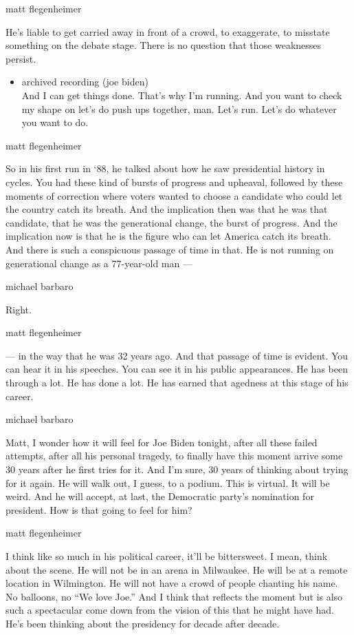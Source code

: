 matt flegenheimer

He's liable to get carried away in front of a crowd, to exaggerate, to
misstate something on the debate stage. There is no question that those
weaknesses persist.

\begin{itemize}
\tightlist
\item
  archived recording (joe biden)\\
  And I can get things done. That's why I'm running. And you want to
  check my shape on let's do push ups together, man. Let's run. Let's do
  whatever you want to do.
\end{itemize}

matt flegenheimer

So in his first run in `88, he talked about how he saw presidential
history in cycles. You had these kind of bursts of progress and
upheaval, followed by these moments of correction where voters wanted to
choose a candidate who could let the country catch its breath. And the
implication then was that he was that candidate, that he was the
generational change, the burst of progress. And the implication now is
that he is the figure who can let America catch its breath. And there is
such a conspicuous passage of time in that. He is not running on
generational change as a 77-year-old man ---

michael barbaro

Right.

matt flegenheimer

--- in the way that he was 32 years ago. And that passage of time is
evident. You can hear it in his speeches. You can see it in his public
appearances. He has been through a lot. He has done a lot. He has earned
that agedness at this stage of his career.

michael barbaro

Matt, I wonder how it will feel for Joe Biden tonight, after all these
failed attempts, after all his personal tragedy, to finally have this
moment arrive some 30 years after he first tries for it. And I'm sure,
30 years of thinking about trying for it again. He will walk out, I
guess, to a podium. This is virtual. It will be weird. And he will
accept, at last, the Democratic party's nomination for president. How is
that going to feel for him?

matt flegenheimer

I think like so much in his political career, it'll be bittersweet. I
mean, think about the scene. He will not be in an arena in Milwaukee. He
will be at a remote location in Wilmington. He will not have a crowd of
people chanting his name. No balloons, no ``We love Joe.'' And I think
that reflects the moment but is also such a spectacular come down from
the vision of this that he might have had. He's been thinking about the
presidency for decade after decade.

